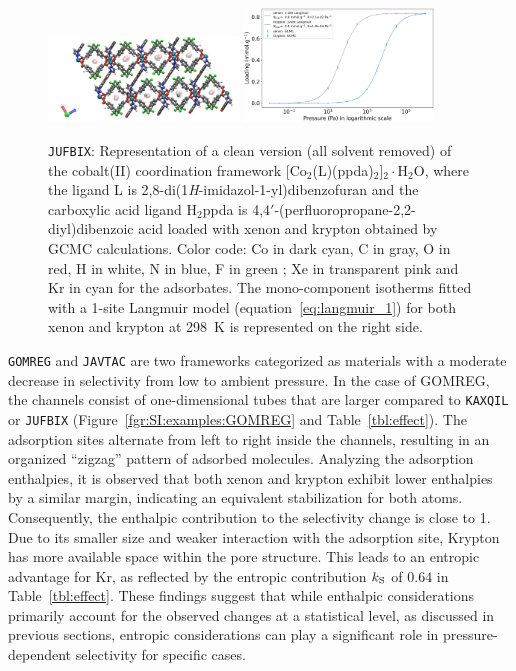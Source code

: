 \documentclass[main.tex]{subfiles}
\begin{document}
\begin{figure}[ht]
  \centering
    \includegraphics[width=0.45\textwidth]{figures/2-thermo/JUFBIX_clean.jpg}
    \includegraphics[width=0.45\textwidth]{figures/2-thermo/JUFBIX_clean_isotherm_xenon_krypton_298K.jpg}
    \caption{\texttt{JUFBIX}: Representation of a clean version (all solvent removed) of the cobalt(II) coordination framework [Co$_2$(L)(ppda)$_2$]$_2\cdot$H$_2$O, where the ligand L is 2,8-di(1\emph{H}-imidazol-1-yl)dibenzofuran and the carboxylic acid ligand H$_2$ppda is 4,$4'$-(perfluoropropane-2,2-diyl)dibenzoic acid loaded with xenon and krypton obtained by GCMC calculations. Color code: Co in dark cyan, C in gray, O in red, H in white, N in blue, F in green ; Xe in transparent pink and Kr in cyan for the adsorbates. The mono-component isotherms fitted with a 1-site Langmuir model (equation~\ref{eq:langmuir_1}) for both xenon and krypton at \SI{298}{\kelvin} is represented on the right side.}\label{fgr:SI:examples:JUFBIX}
  \end{figure}

  \texttt{GOMREG} and \texttt{JAVTAC} are two frameworks categorized as materials with a moderate decrease in selectivity from low to ambient pressure. In the case of GOMREG, the channels consist of one-dimensional tubes that are larger compared to \texttt{KAXQIL} or \texttt{JUFBIX} (Figure~\ref{fgr:SI:examples:GOMREG} and Table~\ref{tbl:effect}). The adsorption sites alternate from left to right inside the channels, resulting in an organized ``zigzag'' pattern of adsorbed molecules. Analyzing the adsorption enthalpies, it is observed that both xenon and krypton exhibit lower enthalpies by a similar margin, indicating an equivalent stabilization for both atoms. Consequently, the enthalpic contribution to the selectivity change is close to 1. 
Due to its smaller size and weaker interaction with the adsorption site, Krypton has more available space within the pore structure. This leads to an entropic advantage for Kr, as reflected by the entropic contribution $k_{\text{S}}$ of $0.64$ in Table~\ref{tbl:effect}. These findings suggest that while enthalpic considerations primarily account for the observed changes at a statistical level, as discussed in previous sections, entropic considerations can play a significant role in pressure-dependent selectivity for specific cases.
\end{document}
